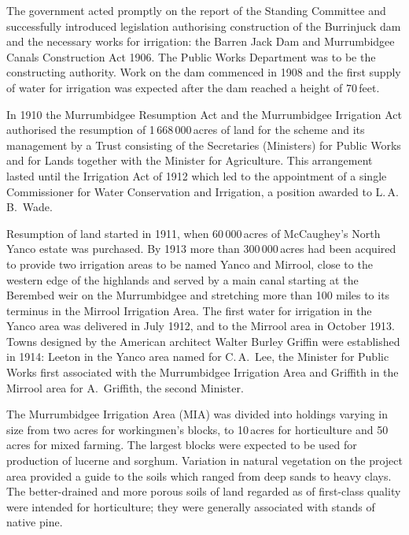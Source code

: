 The government acted promptly on the report of the Standing Committee
and successfully introduced legislation authorising construction of
the Burrinjuck dam and the necessary works for
irrigation: the Barren Jack Dam and Murrumbidgee Canals Construction
Act 1906.  The Public Works Department was to be the
constructing authority.  Work on the dam commenced in 1908 and the
first supply of water for irrigation was expected after the dam
reached a height of 70\,feet.

In 1910 the Murrumbidgee Resumption Act
 and the
Murrumbidgee Irrigation Act  authorised the resumption of 1\,668\,000\,acres of
land for the scheme and its management by a Trust consisting of the
Secretaries (Ministers) for Public Works and for Lands together with
the Minister for Agriculture. This arrangement lasted until the
Irrigation Act of 1912  which
led to the appointment of a single Commissioner for Water Conservation
and Irrigation, a position awarded to
L.\,A.\,B.~Wade.

Resumption of land started in 1911, when 60\,000\,acres of
McCaugh\-ey's North Yanco estate was purchased.  By 1913 more than
300\,000\,acres had been acquired to provide two irrigation areas to
be named Yanco and Mirrool,  
close to the western edge of the highlands and served by a main canal
starting at the Berembed weir  on the
Murrumbidgee and stretching more than 100 miles to its terminus in the
Mirrool Irrigation Area.  The first
water for irrigation in the Yanco area was delivered in July 1912, and
to the Mirrool area in October 1913.  Towns designed by the
American architect Walter Burley Griffin  were established in 1914: Leeton  in
the Yanco area named for C.\,A.~Lee,  the Minister
for Public Works first associated with the Murrumbidgee Irrigation
Area and Griffith  in the Mirrool area for
A.~Griffith, the second
Minister.

The Murrumbidgee Irrigation Area (MIA)
 was divided into holdings varying
in size from two acres for workingmen's blocks, to 10\,acres for
horticulture and 50\,acres for mixed farming.  The largest blocks were
expected to be used for production of lucerne and
sorghum.  Variation in natural vegetation on the project area provided
a guide to the soils which ranged from deep sands to heavy clays.  The
better-drained and more porous soils of land regarded
as of first-class quality were intended for horticulture; they were
generally associated with stands of native pine.

